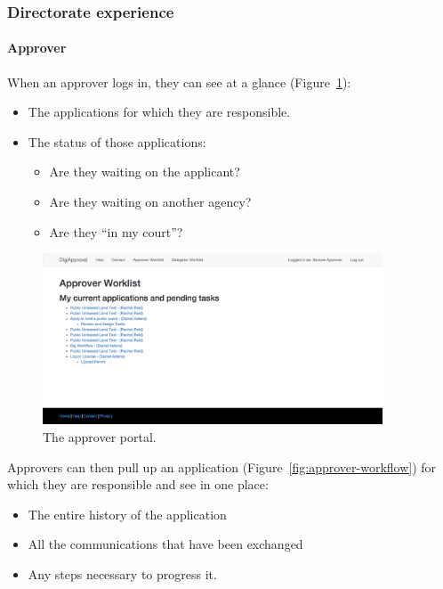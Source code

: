 \documentclass[12pt,a4paper,twosided]{article}
\begin{document}
\subsubsection{Directorate experience}

\paragraph{Approver}

When an approver logs in, they can see at a glance (Figure~\ref{fig:approver-portal}):

\begin{itemize}

\item
  The applications for which they are responsible.
\item
  The status of those applications:

  \begin{itemize}
  
  \item
    Are they waiting on the applicant?
  \item
    Are they waiting on another agency?
  \item
    Are they ``in my court''?
  \end{itemize}
\end{itemize}

\begin{figure}[h!]
  \centering
  \includegraphics[width=0.9\textwidth]{approver-portal.png}
  \caption{The approver portal.}
  \label{fig:approver-portal}
\end{figure}

Approvers can then pull up an application (Figure~\ref{fig:approver-workflow}) for which they are
responsible and see in one place:

\begin{itemize}

\item
  The entire history of the application
\item
  All the communications that have been exchanged
\item
  Any steps necessary to progress it.
\end{itemize}
\end{document}
